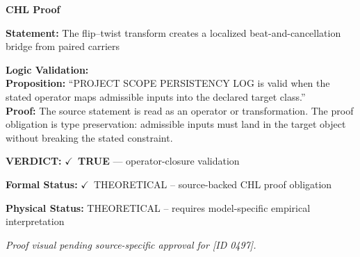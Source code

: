 \vspace{0.45em}
\noindent\textbf{CHL Proof}\par
\textbf{Statement:} The flip--twist transform creates a localized beat-and-cancellation bridge from paired
carriers

\textbf{Logic Validation:}\\
\textbf{Proposition:} ``PROJECT SCOPE PERSISTENCY LOG is valid when the stated operator maps admissible inputs
into the declared target class.''\\
\textbf{Proof:} The source statement is read as an operator or transformation. The proof obligation is
type preservation: admissible inputs must land in the target object without breaking the
stated constraint.

\textbf{VERDICT:} \ensuremath{\checkmark}\ \textbf{TRUE} --- operator-closure validation

\textbf{Formal Status:} \ensuremath{\checkmark}\ THEORETICAL -- source-backed CHL proof obligation

\textbf{Physical Status:} THEORETICAL -- requires model-specific empirical interpretation
\par\vspace{0.45em}
\par
\vfill
\begingroup\footnotesize\itshape
Proof visual pending source-specific approval for [ID 0497].
\par\endgroup
\vfill
\endgroup
\endgroup

